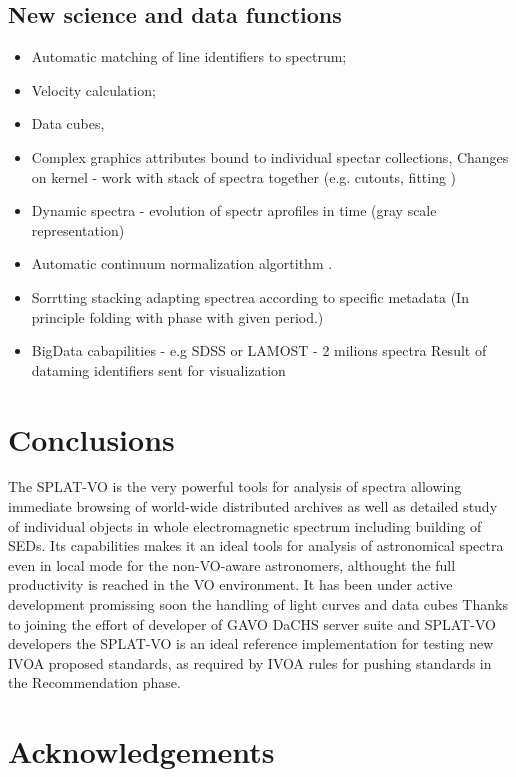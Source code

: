 \documentclass[final,authoryear,5p,times,twocolumn]{elsarticle}
\begin{document}
\subsection{New science and data functions}
\begin{itemize}
\item Automatic matching of line identifiers to spectrum;
\item	Velocity calculation;
\item Data cubes, 
\item Complex graphics attributes bound to individual spectar collections, Changes on kernel - work with stack of spectra together (e.g. cutouts, fitting )
\item Dynamic spectra - evolution of spectr aprofiles in time (gray scale representation)
\item Automatic continuum normalization algortithm .
\item Sorrtting stacking adapting spectrea according to specific metadata (In principle folding with phase with given period.)
\item BigData cabapilities - e.g SDSS or LAMOST - 2 milions spectra Result of dataming identifiers sent for visualization
\end{itemize}

\section{Conclusions}

The SPLAT-VO is the very powerful tools for analysis of spectra
allowing immediate browsing of world-wide distributed archives as well
as detailed study of individual objects in whole electromagnetic
spectrum including building of SEDs. Its capabilities makes it an
ideal tools for analysis of astronomical spectra even in local mode
for the non-VO-aware astronomers, althought the full productivity is
reached in the VO environment.  It has been under active development
promissing soon the handling of light curves and data cubes Thanks to
joining the effort of developer of GAVO DaCHS server suite and
SPLAT-VO developers the SPLAT-VO is an ideal reference implementation
for testing new IVOA proposed standards, as required by IVOA rules for
pushing standards in the Recommendation phase.

\section*{Acknowledgements}
\end{document}
